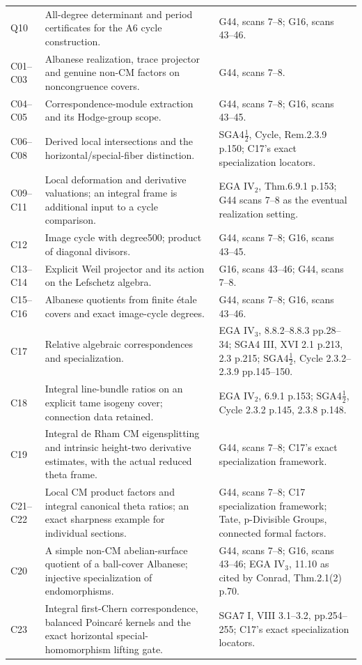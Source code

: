 \begin{longtable}{@{}p{.18\linewidth}p{.48\linewidth}p{.27\linewidth}@{}}
Q10 & All-degree determinant and period certificates for the A6 cycle construction. & G44, scans 7--8; G16, scans 43--46.\\
C01--C03 & Albanese realization, trace projector and genuine non-CM factors on noncongruence covers. & G44, scans 7--8.\\
C04--C05 & Correspondence-module extraction and its Hodge-group scope. & G44, scans 7--8; G16, scans 43--45.\\
C06--C08 & Derived local intersections and the horizontal/special-fiber distinction. & SGA4$\frac12$, Cycle, Rem.2.3.9 p.150; C17's exact specialization locators.\\
C09--C11 & Local deformation and derivative valuations; an integral frame is additional input to a cycle comparison. & EGA IV$_2$, Thm.6.9.1 p.153; G44 scans 7--8 as the eventual realization setting.\\
C12 & Image cycle with degree500; product of diagonal divisors. & G44, scans 7--8; G16, scans 43--45.\\
C13--C14 & Explicit Weil projector and its action on the Lefschetz algebra. & G16, scans 43--46; G44, scans 7--8.\\
C15--C16 & Albanese quotients from finite \'etale covers and exact image-cycle degrees. & G44, scans 7--8; G16, scans 43--46.\\
C17 & Relative algebraic correspondences and specialization. & EGA IV$_3$, 8.8.2--8.8.3 pp.28--34; SGA4 III, XVI 2.1 p.213, 2.3 p.215; SGA4$\frac12$, Cycle 2.3.2--2.3.9 pp.145--150.\\
C18 & Integral line-bundle ratios on an explicit tame isogeny cover; connection data retained. & EGA IV$_2$, 6.9.1 p.153; SGA4$\frac12$, Cycle 2.3.2 p.145, 2.3.8 p.148.\\
C19 & Integral de Rham CM eigensplitting and intrinsic height-two derivative estimates, with the actual reduced theta frame. & G44, scans 7--8; C17's exact specialization framework.\\
C21--C22 & Local CM product factors and integral canonical theta ratios; an exact sharpness example for individual sections. & G44, scans 7--8; C17 specialization framework; Tate, p-Divisible Groups, connected formal factors.\\
C20 & A simple non-CM abelian-surface quotient of a ball-cover Albanese; injective specialization of endomorphisms. & G44, scans 7--8; G16, scans 43--46; EGA IV$_3$, 11.10 as cited by Conrad, Thm.2.1(2) p.70.\\
C23 & Integral first-Chern correspondence, balanced Poincar\'e kernels and the exact horizontal special-homomorphism lifting gate. & SGA7 I, VIII 3.1--3.2, pp.254--255; C17's exact specialization locators.\\

\end{longtable}
